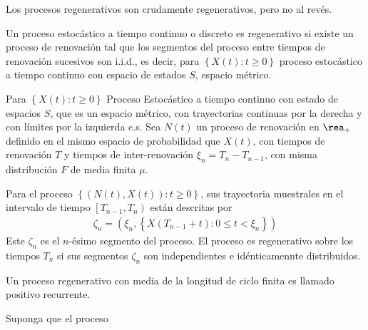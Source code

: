 \begin{Note}
Los procesos regenerativos son crudamente regenerativos, pero no al rev\'es.
\end{Note}


\begin{Note}
Un proceso estoc\'astico a tiempo continuo o discreto es regenerativo si existe un proceso de renovaci\'on  tal que los segmentos del proceso entre tiempos de renovaci\'on sucesivos son i.i.d., es decir, para $\left\{X\left(t\right):t\geq0\right\}$ proceso estoc\'astico a tiempo continuo con espacio de estados $S$, espacio m\'etrico.
\end{Note}

Para $\left\{X\left(t\right):t\geq0\right\}$ Proceso Estoc\'astico a tiempo continuo con estado de espacios $S$, que es un espacio m\'etrico, con trayectorias continuas por la derecha y con l\'imites por la izquierda c.s. Sea $N\left(t\right)$ un proceso de renovaci\'on en $\rea_{+}$ definido en el mismo espacio de probabilidad que $X\left(t\right)$, con tiempos de renovaci\'on $T$ y tiempos de inter-renovaci\'on $\xi_{n}=T_{n}-T_{n-1}$, con misma distribuci\'on $F$ de media finita $\mu$.



\begin{Def}
Para el proceso $\left\{\left(N\left(t\right),X\left(t\right)\right):t\geq0\right\}$, sus trayectoria muestrales en el intervalo de tiempo $\left[T_{n-1},T_{n}\right)$ est\'an descritas por
\begin{eqnarray*}
\zeta_{n}=\left(\xi_{n},\left\{X\left(T_{n-1}+t\right):0\leq t<\xi_{n}\right\}\right)
\end{eqnarray*}
Este $\zeta_{n}$ es el $n$-\'esimo segmento del proceso. El proceso es regenerativo sobre los tiempos $T_{n}$ si sus segmentos $\zeta_{n}$ son independientes e id\'enticamennte distribuidos.
\end{Def}

\begin{Note}
Un proceso regenerativo con media de la longitud de ciclo finita es llamado positivo recurrente.
\end{Note}

\begin{Teo}
Suponga que el proceso
\end{Teo}


